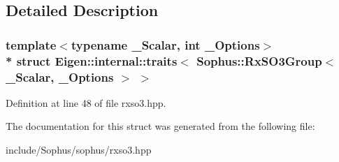 \subsection{Detailed Description}
\subsubsection*{template$<$typename \+\_\+\+Scalar, int \+\_\+\+Options$>$\\*
struct Eigen\+::internal\+::traits$<$ Sophus\+::\+Rx\+S\+O3\+Group$<$ \+\_\+\+Scalar, \+\_\+\+Options $>$ $>$}



Definition at line 48 of file rxso3.\+hpp.



The documentation for this struct was generated from the following file\+:\begin{DoxyCompactItemize}
\item 
include/\+Sophus/sophus/rxso3.\+hpp\end{DoxyCompactItemize}
